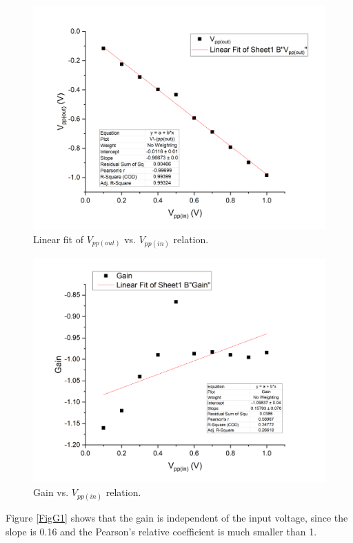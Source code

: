 \documentclass{article}
\begin{document}
\begin{figure}[H]
\centering
\includegraphics[scale=0.35]{plot3.png}
\caption{Linear fit of $V_{pp(out)}$ vs. $V_{pp(in)}$ relation.}\label{FigInvFit}
\end{figure}

\begin{figure}[H]
\centering
\includegraphics[scale=0.35]{plot4.png}
\caption{Gain vs. $V_{pp(in)}$ relation.}\label{FigG2}
\end{figure}

Figure \ref{FigG1} shows that the gain is independent of the input voltage, since the slope is 0.16 and the Pearson's relative coefficient is much smaller than 1.
\end{document}
